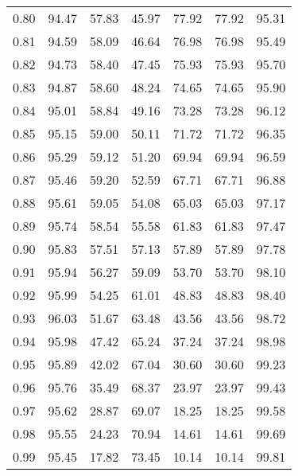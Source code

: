 \begin{tabular}{|c|c|c|c|c|c|c|}
      0.80 &     94.47 &     57.83 &      45.97 &   77.92 &      77.92 &         95.31 \\
      0.81 &     94.59 &     58.09 &      46.64 &   76.98 &      76.98 &         95.49 \\
      0.82 &     94.73 &     58.40 &      47.45 &   75.93 &      75.93 &         95.70 \\
      0.83 &     94.87 &     58.60 &      48.24 &   74.65 &      74.65 &         95.90 \\
      0.84 &     95.01 &     58.84 &      49.16 &   73.28 &      73.28 &         96.12 \\
      0.85 &     95.15 &     59.00 &      50.11 &   71.72 &      71.72 &         96.35 \\
      0.86 &     95.29 &     59.12 &      51.20 &   69.94 &      69.94 &         96.59 \\
      0.87 &     95.46 &     59.20 &      52.59 &   67.71 &      67.71 &         96.88 \\
      0.88 &     95.61 &     59.05 &      54.08 &   65.03 &      65.03 &         97.17 \\
      0.89 &     95.74 &     58.54 &      55.58 &   61.83 &      61.83 &         97.47 \\
      0.90 &     95.83 &     57.51 &      57.13 &   57.89 &      57.89 &         97.78 \\
      0.91 &     95.94 &     56.27 &      59.09 &   53.70 &      53.70 &         98.10 \\
      0.92 &     95.99 &     54.25 &      61.01 &   48.83 &      48.83 &         98.40 \\
      0.93 &     96.03 &     51.67 &      63.48 &   43.56 &      43.56 &         98.72 \\
      0.94 &     95.98 &     47.42 &      65.24 &   37.24 &      37.24 &         98.98 \\
      0.95 &     95.89 &     42.02 &      67.04 &   30.60 &      30.60 &         99.23 \\
      0.96 &     95.76 &     35.49 &      68.37 &   23.97 &      23.97 &         99.43 \\
      0.97 &     95.62 &     28.87 &      69.07 &   18.25 &      18.25 &         99.58 \\
      0.98 &     95.55 &     24.23 &      70.94 &   14.61 &      14.61 &         99.69 \\
      0.99 &     95.45 &     17.82 &      73.45 &   10.14 &      10.14 &         99.81 \\
\bottomrule
\end{tabular}
